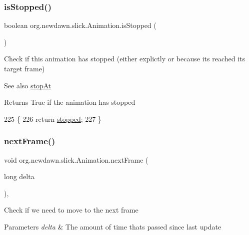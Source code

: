 \subsubsection{\texorpdfstring{is\+Stopped()}{isStopped()}}
{\footnotesize\ttfamily boolean org.\+newdawn.\+slick.\+Animation.\+is\+Stopped (\begin{DoxyParamCaption}{ }\end{DoxyParamCaption})\hspace{0.3cm}{\ttfamily [inline]}}

Check if this animation has stopped (either explictly or because it\textquotesingle{}s reached its target frame)

\begin{DoxySeeAlso}{See also}
\mbox{\hyperlink{classorg_1_1newdawn_1_1slick_1_1_animation_a4b2bd97ccab1897bcca89f4d873b5db1}{stop\+At}} 
\end{DoxySeeAlso}
\begin{DoxyReturn}{Returns}
True if the animation has stopped 
\end{DoxyReturn}

\begin{DoxyCode}
225                                \{
226         \textcolor{keywordflow}{return} \mbox{\hyperlink{classorg_1_1newdawn_1_1slick_1_1_animation_ab5b77fdd8772bd15d24ea9d21fa3873d}{stopped}};
227     \}
\end{DoxyCode}
\mbox{\label{classorg_1_1newdawn_1_1slick_1_1_animation_ae23662cd09dfe23e566c45b9bf85d97a}} 
\subsubsection{\texorpdfstring{next\+Frame()}{nextFrame()}}
{\footnotesize\ttfamily void org.\+newdawn.\+slick.\+Animation.\+next\+Frame (\begin{DoxyParamCaption}\item[{long}]{delta }\end{DoxyParamCaption})\hspace{0.3cm}{\ttfamily [inline]}, {\ttfamily [private]}}

Check if we need to move to the next frame


\begin{DoxyParams}{Parameters}
{\em delta} & The amount of time thats passed since last update \\
\hline
\end{DoxyParams}

